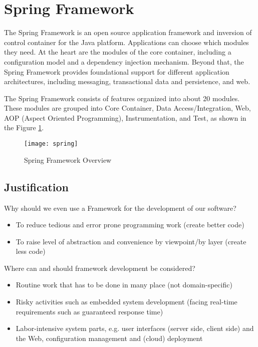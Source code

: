 \section{Spring Framework}
The Spring Framework is an open source application framework and inversion of control container for the Java platform. Applications can choose which modules they need. At the heart are the modules of the core container, including a configuration model and a dependency injection mechanism. Beyond that, the Spring Framework provides foundational support for different application architectures, including messaging, transactional data and persistence, and web.

The Spring Framework consists of features organized into about 20 modules. These modules are grouped into Core Container, Data Access/Integration, Web, AOP (Aspect Oriented Programming), Instrumentation, and Test, as shown in the Figure \ref{fig:springframework}.

\begin{figure}[H]
  \center
  \texttt{[image: spring]}
  \caption{Spring Framework Overview}
  \label{fig:springframework}
\end{figure}

\subsection{Justification}
Why should we even use a Framework for the development of our software?
\begin{itemize}
	\item To reduce tedious and error prone programming work (create better code)
	\item To raise level of abstraction and convenience by viewpoint/by layer (create less code)
\end{itemize}

Where can and should framework development be considered?
\begin{itemize}
	\item Routine work that has to be done in many place (not domain-specific)
	\item Risky activities such as embedded system development (facing real-time requirements such as guaranteed response time)
	\item Labor-intensive system parts, e.g. user interfaces (server side, client side) and the Web, configuration management and (cloud) deployment
\end{itemize}

